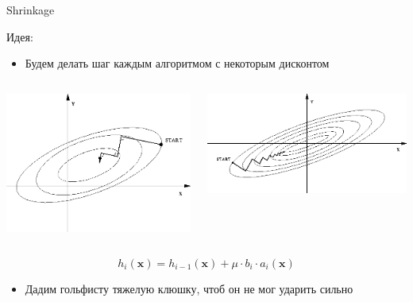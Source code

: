 \documentclass[10pt]{beamer}
\begin{document}
\begin{frame}{Shrinkage}
\begin{block}{Идея:}
\end{block}
\begin{itemize}
    \item Будем делать шаг каждым алгоритмом с некоторым дисконтом
\end{itemize}
\begin{columns}[C]
    \begin{column}{.5\textwidth}
        \includegraphics[scale=0.3]{images/stepestdecent.png}
    \end{column}
    \begin{column}{.5\textwidth}
        \includegraphics[scale=0.3]{images/shrinkage.png}
    \end{column}
\end{columns}
\[
    h_{i}(\mathbf{x}) = h_{i-1}(\mathbf{x}) + \mu \cdot b_i \cdot  a_i(\mathbf{x})
\]
\begin{itemize}
    \item Дадим гольфисту тяжелую клюшку, чтоб он не мог ударить сильно
\end{itemize}
\end{frame}
\end{document}
